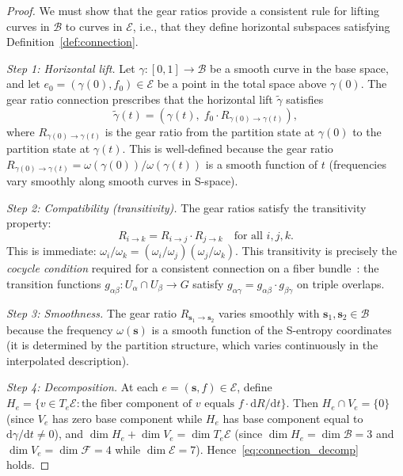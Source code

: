 \documentclass[11pt,twocolumn,a4paper]{article}
\theoremstyle{definition}
\newcommand{\Fib}{\mathcal{F}}
\newcommand{\Bsp}{\mathcal{B}}
\newcommand{\Esp}{\mathcal{E}}
\newcommand{\dif}{\mathrm{d}}
\newcommand{\Rij}{R_{i \to j}}
\newcommand{\Rik}{R_{i \to k}}
\newcommand{\Rjk}{R_{j \to k}}
\begin{document}
\begin{proof}
We must show that the gear ratios provide a consistent rule for lifting curves in $\Bsp$
to curves in $\Esp$, i.e., that they define horizontal subspaces satisfying
Definition~\ref{def:connection}.

\emph{Step 1: Horizontal lift.}
Let $\gamma: [0,1] \to \Bsp$ be a smooth curve in the base space, and let
$e_0 = (\gamma(0), f_0) \in \Esp$ be a point in the total space above $\gamma(0)$.
The gear ratio connection prescribes that the horizontal lift $\tilde{\gamma}$ satisfies
\begin{equation}\label{eq:horizontal_lift}
  \tilde{\gamma}(t) = (\gamma(t),\; f_0 \cdot R_{\gamma(0) \to \gamma(t)}),
\end{equation}
where $R_{\gamma(0) \to \gamma(t)}$ is the gear ratio from the partition state at
$\gamma(0)$ to the partition state at $\gamma(t)$. This is well-defined because the gear
ratio $R_{\gamma(0) \to \gamma(t)} = \omega(\gamma(0))/\omega(\gamma(t))$ is a smooth
function of $t$ (frequencies vary smoothly along smooth curves in S-space).

\emph{Step 2: Compatibility (transitivity).}
The gear ratios satisfy the transitivity property:
\begin{equation}\label{eq:transitivity}
  \Rik = \Rij \cdot \Rjk \quad \text{for all } i, j, k.
\end{equation}
This is immediate: $\omega_i/\omega_k = (\omega_i/\omega_j)(\omega_j/\omega_k)$.
This transitivity is precisely the \emph{cocycle condition} required for a consistent
connection on a fiber bundle~\cite{kobayashi1963}: the transition functions
$g_{\alpha\beta}: U_\alpha \cap U_\beta \to G$ satisfy
$g_{\alpha\gamma} = g_{\alpha\beta} \cdot g_{\beta\gamma}$ on triple overlaps.

\emph{Step 3: Smoothness.}
The gear ratio $R_{\mathbf{s}_1 \to \mathbf{s}_2}$ varies smoothly with
$\mathbf{s}_1, \mathbf{s}_2 \in \Bsp$ because the frequency $\omega(\mathbf{s})$ is a
smooth function of the S-entropy coordinates (it is determined by the partition structure,
which varies continuously in the interpolated description).

\emph{Step 4: Decomposition.}
At each $e = (\mathbf{s}, f) \in \Esp$, define $H_e = \{v \in T_e\Esp :
\text{the fiber component of } v \text{ equals } f \cdot \dif R / \dif t\}$. Then
$H_e \cap V_e = \{0\}$ (since $V_e$ has zero base component while $H_e$ has base
component equal to $\dif\gamma/\dif t \neq 0$), and $\dim H_e + \dim V_e = \dim T_e\Esp$
(since $\dim H_e = \dim \Bsp = 3$ and $\dim V_e = \dim \Fib = 4$ while
$\dim \Esp = 7$). Hence~\eqref{eq:connection_decomp} holds.
\end{proof}
\end{document}
